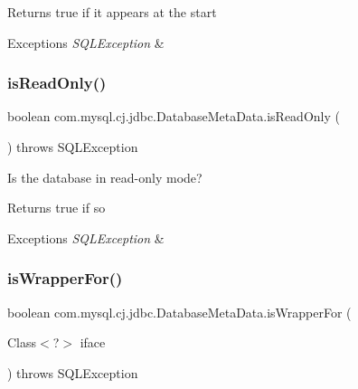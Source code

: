 \begin{DoxyReturn}{Returns}
true if it appears at the start 
\end{DoxyReturn}

\begin{DoxyExceptions}{Exceptions}
{\em S\+Q\+L\+Exception} & \\
\hline
\end{DoxyExceptions}
\mbox{\label{classcom_1_1mysql_1_1cj_1_1jdbc_1_1_database_meta_data_ae2267f22cc38e6bce65f493e566760d1}} 
\subsubsection{\texorpdfstring{is\+Read\+Only()}{isReadOnly()}}
{\footnotesize\ttfamily boolean com.\+mysql.\+cj.\+jdbc.\+Database\+Meta\+Data.\+is\+Read\+Only (\begin{DoxyParamCaption}{ }\end{DoxyParamCaption}) throws S\+Q\+L\+Exception}

Is the database in read-\/only mode?

\begin{DoxyReturn}{Returns}
true if so 
\end{DoxyReturn}

\begin{DoxyExceptions}{Exceptions}
{\em S\+Q\+L\+Exception} & \\
\hline
\end{DoxyExceptions}
\mbox{\label{classcom_1_1mysql_1_1cj_1_1jdbc_1_1_database_meta_data_a8e0ea42ccbf774371b197a8bd88b42d3}} 
\subsubsection{\texorpdfstring{is\+Wrapper\+For()}{isWrapperFor()}}
{\footnotesize\ttfamily boolean com.\+mysql.\+cj.\+jdbc.\+Database\+Meta\+Data.\+is\+Wrapper\+For (\begin{DoxyParamCaption}\item[{Class$<$?$>$}]{iface }\end{DoxyParamCaption}) throws S\+Q\+L\+Exception}

